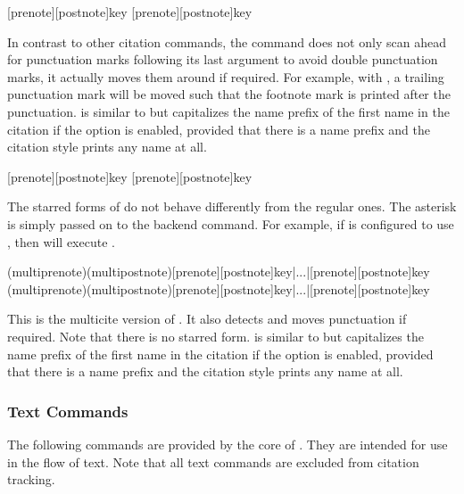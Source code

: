 \documentclass{ltxdockit}[2011/03/25]
\begin{document}
\begin{ltxsyntax}

[prenote][postnote]{key}
[prenote][postnote]{key}

In contrast to other citation commands, the  command does not only scan ahead for punctuation marks following its last argument to avoid double punctuation marks, it actually moves them around if required. For example, with , a trailing punctuation mark will be moved such that the footnote mark is printed after the punctuation.  is similar to  but capitalizes the name prefix of the first name in the citation if the  option is enabled, provided that there is a name prefix and the citation style prints any name at all.

[prenote][postnote]{key}
[prenote][postnote]{key}

The starred forms of  do not behave differently from the regular ones. The asterisk is simply passed on to the backend command. For example, if  is configured to use , then  will execute .

(multiprenote)(multipostnote)[prenote][postnote]{key}|...|[prenote][postnote]{key}
(multiprenote)(multipostnote)[prenote][postnote]{key}|...|[prenote][postnote]{key}

This is the multicite version of . It also detects and moves punctuation if required. Note that there is no starred form.  is similar to  but capitalizes the name prefix of the first name in the citation if the  option is enabled, provided that there is a name prefix and the citation style prints any name at all.

\end{ltxsyntax}

\subsubsection{Text Commands}
\label{use:cit:txt}

The following commands are provided by the core of . They are intended for use in the flow of text. Note that all text commands are excluded from citation tracking.
\end{document}
